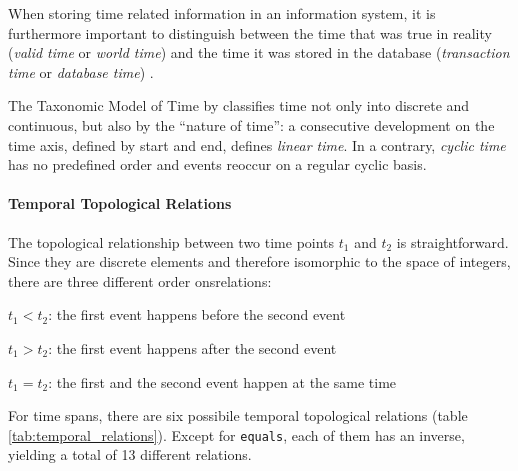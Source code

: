 When storing time related information in an information system, it is furthermore important to distinguish between the time that was true in reality (\emph{valid time} or \emph{world time}) and the time it was stored in the database (\emph{transaction time} or \emph{database time})
\cite[p. 69]{ott2001time}.

The Taxonomic Model of Time by
\cite{frank98typesoftime}
classifies time not only into discrete and continuous, but also by the ``nature of time'': a consecutive development on the time axis, defined by start and end, defines \emph{linear time}. In a contrary, \emph{cyclic time} has no predefined order and events reoccur on a regular cyclic basis.

\paragraph{Temporal Topological Relations} %
\label{par:temporal_relations}

The topological relationship between two time points $t_1$ and $t_2$ is straightforward. Since they are discrete elements and therefore isomorphic to the space of integers, there are three different order onsrelations:
\begin{compactenum}
  \item $t_1 < t_2$: the first event happens before the second event
  \item $t_1 > t_2$: the first event happens after the second event
  \item $t_1 = t_2$: the first and the second event happen at the same time
\end{compactenum}

For time spans, there are six possibile temporal topological relations (table \ref{tab:temporal_relations}). Except for \texttt{equals}, each of them has an inverse, yielding a total of 13 different relations.

